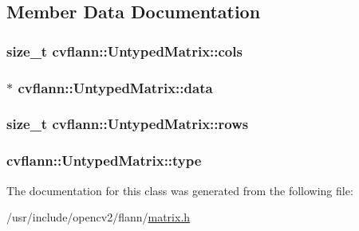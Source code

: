 \subsection{Member Data Documentation}
\hypertarget{classcvflann_1_1UntypedMatrix_a69514c412776db84dbd5759c7fb05ddc}{
\subsubsection[{cols}]{\setlength{\rightskip}{0pt plus 5cm}size\-\_\-t cvflann\-::\-Untyped\-Matrix\-::cols}}\label{classcvflann_1_1UntypedMatrix_a69514c412776db84dbd5759c7fb05ddc}
\hypertarget{classcvflann_1_1UntypedMatrix_acd79379f70bee713a7c4bbbc2c6f84a4}{
\subsubsection[{data}]{$\ast$ cvflann\-::\-Untyped\-Matrix\-::data}}\label{classcvflann_1_1UntypedMatrix_acd79379f70bee713a7c4bbbc2c6f84a4}
\hypertarget{classcvflann_1_1UntypedMatrix_aee23a10b03a3130437818835cf8efadc}{
\subsubsection[{rows}]{\setlength{\rightskip}{0pt plus 5cm}size\-\_\-t cvflann\-::\-Untyped\-Matrix\-::rows}}\label{classcvflann_1_1UntypedMatrix_aee23a10b03a3130437818835cf8efadc}
\hypertarget{classcvflann_1_1UntypedMatrix_a3c9f5d57203b9c3faa48207fbc3118f6}{
\subsubsection[{type}]{ cvflann\-::\-Untyped\-Matrix\-::type}}\label{classcvflann_1_1UntypedMatrix_a3c9f5d57203b9c3faa48207fbc3118f6}


The documentation for this class was generated from the following file\-:\begin{DoxyCompactItemize}
\item 
/usr/include/opencv2/flann/\hyperlink{matrix_8h}{matrix.\-h}\end{DoxyCompactItemize}
